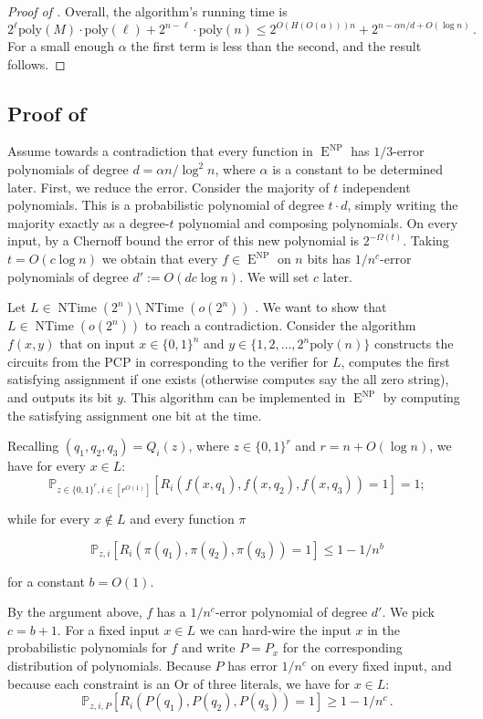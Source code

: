 \documentclass{toc}
\DeclareMathOperator{\NTime}{\mathrm{NTime}}  %
\DeclareMathOperator{\NP}{\mathrm{NP}}  %
\DeclareMathOperator{\EEE}{\mathrm{E}}  %
\newcommand{\zo}{\{0, 1\}}
\renewcommand{\P}{\mathbb{P}}
\newcommand{\poly}{\mathrm{poly}}
\renewcommand{\a}{\alpha}
\begin{document}
\begin{proof}[Proof of ]
Overall, the algorithm's running time is 
\[
2^{\ell}\poly(M)\cdot\poly(\ell)+2^{n-\ell}\cdot\poly(n)\le2^{O(H(O(\alpha)))n}+2^{n-\alpha n/d+O(\log n)}\,.
\]
For a small enough $\alpha$ the first term is less than the second,
and the result follows.
\end{proof}

\subsection{Proof of }

Assume towards a contradiction that every function in $\EEE^{\NP}$ has
$1/3$-error polynomials of degree $d=\alpha n/\log^{2}n$, where
$\a$ is a constant to be determined later. First, we reduce the error.
Consider the majority of $t$ independent polynomials. This is a probabilistic
polynomial of degree $t\cdot d$, simply writing the majority exactly
as a degree-$t$ polynomial and composing polynomials. On every input,
by a Chernoff bound the error of this new polynomial is $2^{-\Omega(t)}$.
Taking $t=O(c\log n)$ we obtain that every $f\in \EEE^{\NP}$ on $n$
bits has $1/n^{c}$-error polynomials of degree $d':=O(dc\log n)$.
We will set $c$ later.

Let $L\in\mathrm{\NTime}(2^{n})\setminus\mathrm{\NTime}(o(2^{n}))$
\cite{Cook73,SeiferasFM78,Zak83}. We want to show that $L\in\mathrm{\NTime}(o(2^{n}))$
to reach a contradiction. Consider the algorithm $f(x,y)$ that on
input $x\in\zo^{n}$ and $y\in\{1,2,\ldots,2^{n}\poly(n)\}$ constructs
the circuits from the PCP in  corresponding
to the verifier for $L$, computes the first satisfying assignment
if one exists (otherwise computes say the all zero string), and outputs
its bit $y$. This algorithm can be implemented in $\EEE^{\NP}$ by computing
the satisfying assignment one bit at the time.

Recalling $(q_{1},q_{2},q_{3})=Q_{i}(z)$, where $z\in\zo^{r}$ and
$r=n+O(\log n)$, we have for every $x\in L$:
\[
\P_{z\in\zo^{r},i\in[r^{O(1)}]}[R_{i}(f(x,q_{1}),f(x,q_{2}),f(x,q_{3}))=1]=1;
\]

while for every $x\not\in L$ and every function $\pi$

\[
\P_{z,i}[R_{i}(\pi(q_{1}),\pi(q_{2}),\pi(q_{3}))=1]\le1-1/n^{b}
\]

for a constant $b=O(1)$.

By the argument above, $f$ has a $1/n^{c}$-error polynomial of degree
$d'$. We pick $c=b+1$. For a fixed input $x\in L$ we can hard-wire
the input $x$ in the probabilistic polynomials for $f$ and write
$P=P_{x}$ for the corresponding distribution of polynomials. Because
$P$ has error $1/n^{c}$ on every fixed input, and because each constraint
is an Or of three literals, we have for $x\in L$:
\[
\P_{z,i,P}[R_{i}(P(q_{1}),P(q_{2}),P(q_{3}))=1]\ge1-1/n^{c}\,.
\]
\end{document}
